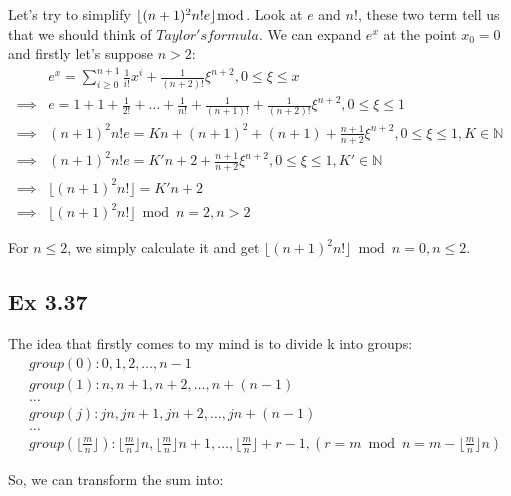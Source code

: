 \documentclass{article}
\begin{document}
Let's try to simplify $\lfloor (n+1)^2  n! e \rfloor \bmod$. Look at $e$ and $n!$, these two term tell us that we should think of $Taylor's formula$. We can expand $e^x$ at the point $x_0=0$ and firstly let's suppose $n>2$:
\begin{equation}
    \begin{split}
    & e^x  = \sum_{i\ge 0}^{n+1}\frac{1}{i!}x^i + \frac{1}{(n+2)!}\xi^{n+2}, 0 \le \xi \le x\\
    \implies & e  = 1 + 1 + \frac{1}{2!} + \dots + \frac{1}{n!} + \frac{1}{(n+1)!} + \frac{1}{(n+2)!}\xi^{n+2}, 0\le \xi \le 1\\
    \implies & (n+1)^2n!e = K n + (n+1)^2 + (n+1) + \frac{n+1}{n+2}\xi^{n+2}, 0\le \xi \le 1, K \in \mathbb{N}\\
    \implies & (n+1)^2n!e = K'n + 2 + \frac{n+1}{n+2}\xi^{n+2}, 0\le \xi \le 1, K' \in \mathbb{N}\\
    \implies & \lfloor (n+1)^2n! \rfloor = K'n + 2\\
    \implies & \lfloor (n+1)^2n! \rfloor \bmod n = 2, n > 2
    \end{split}
\end{equation}

For $n\le 2$, we simply calculate it and get $\lfloor (n+1)^2n! \rfloor \bmod n  = 0, n \le 2$.

\subsection{Ex 3.37}

The idea that firstly comes to my mind is to divide k into groups:
\begin{equation}
    \begin{split}
        & group(0): 0, 1, 2, \dots, n-1\\
        & group(1): n, n+1, n+2, \dots, n + (n-1)\\
        & \dots\\
        & group(j): jn, jn+1, jn+2, \dots, jn + (n-1)\\
        & \dots\\
        & group(\lfloor \frac{m}{n} \rfloor): \lfloor \frac{m}{n} \rfloor n, \lfloor \frac{m}{n} \rfloor n + 1, \dots, \lfloor \frac{m}{n} \rfloor + r - 1,
               (r = m \bmod n = m - \lfloor \frac{m}{n} \rfloor n)
    \end{split}
\end{equation}

So, we can transform the sum into:
\end{document}
